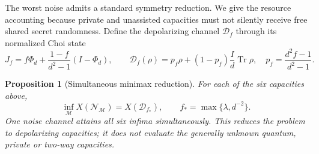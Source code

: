 \documentclass[11pt]{article}
\newtheorem{proposition}[theorem]{Proposition}
\newcommand{\Tr}{\operatorname{Tr}}
\begin{document}
The worst noise admits a standard symmetry reduction. We give the
resource accounting because private and unassisted capacities must
not silently receive free shared secret randomness. Define the
depolarizing channel $\mathcal D_f$ through its normalized Choi state
\begin{equation}\label{eq:isotropic}
 J_f=f\Phi_d+\frac{1-f}{d^2-1}(I-\Phi_d),\qquad
 \mathcal D_f(\rho)=p_f\rho+(1-p_f)\frac{I}{d}\Tr\rho,
 \quad p_f=\frac{d^2f-1}{d^2-1}.
\end{equation}

\begin{proposition}[Simultaneous minimax reduction]\label{prop:minimax}
For each of the six capacities above,
\begin{equation}\label{eq:exactminimax}
 \inf_{\mathcal M}X(\mathcal N_{\mathcal M})
 =X(\mathcal D_{f_*}),\qquad f_* = \max\{\lambda,d^{-2}\}.
\end{equation}
One noise channel attains all six infima simultaneously. This reduces
the problem to depolarizing capacities; it does not evaluate the
generally unknown quantum, private or two-way capacities.
\end{proposition}
\end{document}

